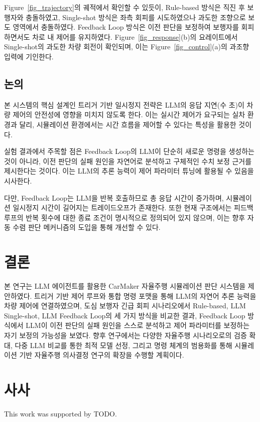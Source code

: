 \documentclass[final,5p,times,twocolumn,9pt]{elsarticle}
\begin{document}
Figure~\ref{fig_trajectory}의 궤적에서 확인할 수 있듯이, Rule-based 방식은 직진 후 보행자와 충돌하였고, Single-shot 방식은 좌측 회피를 시도하였으나 과도한 조향으로 보도 영역에서 충돌하였다. Feedback Loop 방식은 이전 판단을 보정하여 보행자를 회피하면서도 차로 내 제어를 유지하였다. Figure~\ref{fig_response}(b)의 요레이트에서 Single-shot의 과도한 차량 회전이 확인되며, 이는 Figure~\ref{fig_control}(a)의 과조향 입력에 기인한다.


\subsection{논의}
\label{sec:discussion}

본 시스템의 핵심 설계인 트리거 기반 일시정지 전략은 LLM의 응답 지연(수 초)이 차량 제어의 안전성에 영향을 미치지 않도록 한다. 이는 실시간 제어가 요구되는 실차 환경과 달리, 시뮬레이션 환경에서는 시간 흐름을 제어할 수 있다는 특성을 활용한 것이다.

실험 결과에서 주목할 점은 Feedback Loop의 LLM이 단순히 새로운 명령을 생성하는 것이 아니라, 이전 판단의 실패 원인을 자연어로 분석하고 구체적인 수치 보정 근거를 제시한다는 것이다. 이는 LLM의 추론 능력이 제어 파라미터 튜닝에 활용될 수 있음을 시사한다.

다만, Feedback Loop는 LLM을 반복 호출하므로 총 응답 시간이 증가하며, 시뮬레이션 일시정지 시간이 길어지는 트레이드오프가 존재한다. 또한 현재 구조에서는 피드백 루프의 반복 횟수에 대한 종료 조건이 명시적으로 정의되어 있지 않으며, 이는 향후 자동 수렴 판단 메커니즘의 도입을 통해 개선할 수 있다.


\section{결론}
\label{sec:conclusion}

본 연구는 LLM 에이전트를 활용한 CarMaker 자율주행 시뮬레이션 판단 시스템을 제안하였다. 트리거 기반 제어 루프와 통합 명령 포맷을 통해 LLM의 자연어 추론 능력을 차량 제어에 연결하였으며, 도심 보행자 긴급 회피 시나리오에서 Rule-based, LLM Single-shot, LLM Feedback Loop의 세 가지 방식을 비교한 결과, Feedback Loop 방식에서 LLM이 이전 판단의 실패 원인을 스스로 분석하고 제어 파라미터를 보정하는 자기 보정의 가능성을 보였다. 향후 연구에서는 다양한 자율주행 시나리오로의 검증 확대, 다중 LLM 비교를 통한 최적 모델 선정, 그리고 명령 체계의 범용화를 통해 시뮬레이션 기반 자율주행 의사결정 연구의 확장을 수행할 계획이다.


\section*{사사}
This work was supported by TODO.




\end{document}
